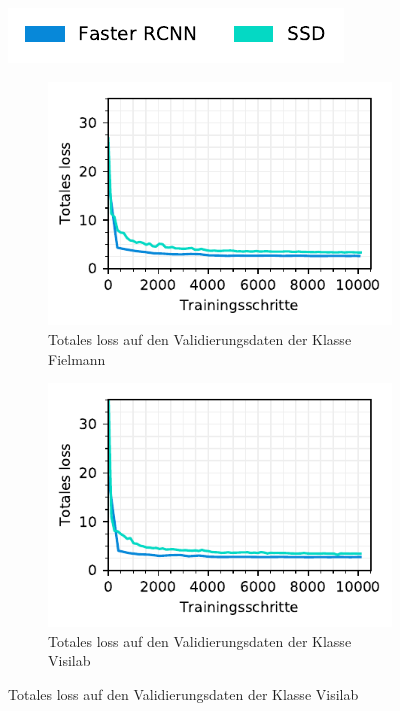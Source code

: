 \begin{figure}[h!] 
  \captionsetup{width=.9\linewidth}
  \label{fig:specific-ie:loss}
  \caption{TODO}
  \centering
  \includegraphics[scale=1]{graphics/matplot/img-detection__legend_1.pdf}
  \begin{subfigure}[b]{0.45\linewidth}
    \centering
    \includegraphics[scale=1]{graphics/matplot/img-detection__fielmann__loss.pdf}
    \caption{Totales loss auf den Validierungsdaten der Klasse Fielmann} 
    \label{fig:specific-ie:fielmann:loss}
    \vspace{2ex}
  \end{subfigure}%
  \begin{subfigure}[b]{0.45\linewidth}
    \centering
    \includegraphics[scale=1]{graphics/matplot/img-detection__visilab__loss.pdf}
    \caption{Totales loss auf den Validierungsdaten der Klasse Visilab} 
    \label{fig:specific-ie:visilab:loss}
    \vspace{2ex}
  \end{subfigure} 
\end{figure}

